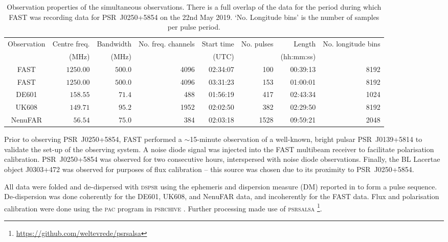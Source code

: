 \begin{table}
	\centering
	\caption[Simultaneous observations of PSR~J0250+5854]{Observation properties of the simultaneous observations. There is a full overlap of the data for the period during which FAST was recording data for PSR~J0250+5854 on the 22nd May 2019. `No. Longitude bins' is the number of samples per pulse period.}
	\label{tab: observations}
	\begin{tabular}{crrrrrrr} %
		\hline
	    Observation & Centre freq. & Bandwidth & No. freq. channels & Start time & No. pulses & Length & No. longitude bins\\
	    & (MHz) & (MHz) & & (UTC) & & (hh:mm:ss) & \\
		\hline
		FAST        & $1250.00$ & $500.0$   & 4096 & 02:34:07  & 100   & 00:39:13  & 8192 \\
		FAST	    & $1250.00$ & $500.0$   & 4096 & 03:31:23 & 153   & 01:00:01  & 8192 \\
		DE601        & $158.55$  & $71.4$    & 488  & 01:56:19  & 417   & 02:43:34  & 1024   \\
		UK608  & $149.71$  & $95.2$    & 1952 & 02:02:50  & 382   & 02:29:50  & 8192  \\
		NenuFAR     & $56.54$   & $75.0$    & 384  & 02:03:18  & 1528  & 09:59:21  & 2048   \\
		\hline
	\end{tabular}
\end{table}

Prior to observing PSR~J0250+5854, FAST performed a $\sim$15-minute observation of a well-known, bright pulsar PSR~J0139+5814 to validate the set-up of the observing system. A noise diode signal was injected into the FAST multibeam receiver to facilitate polarisation calibration. PSR~J0250+5854 was observed for two consecutive hours, interspersed with noise diode observations. Finally, the BL Lacertae object J0303+472 \citep{VVxx2006} was observed for purposes of flux calibration -- this source was chosen due to its proximity to PSR~J0250+5854.

All data were folded and de-dispersed with \textsc{dspsr} \citep{SBxx2011} using the ephemeris and dispersion measure (DM) reported in \citet{TBC+2018} to form a pulse sequence. De-dispersion was done coherently for the DE601, UK608, and NenuFAR data, and incoherently for the FAST data. Flux and polarisation calibration were done using the \textsc{pac} program in \textsc{psrchive} \citep{HSMx2004}. Further processing made use of \textsc{psrsalsa} \citep{Wxxx2016}\footnote{\url{https://github.com/weltevrede/psrsalsa}}.

